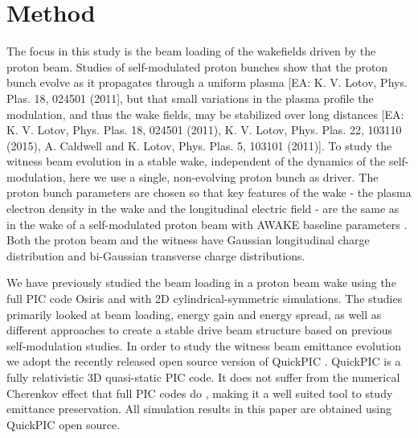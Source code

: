 \documentclass[aps,prstab,reprint,amsmath,amssymb,groupedaddress,onecolumn]{revtex4-1}
\begin{document}


\section[\label{S:M}]{Method}

The focus in this study is the beam loading of the wakefields driven by the proton beam.   Studies of self-modulated proton bunches show that the proton bunch evolve as it propagates through a uniform plasma [EA: K. V. Lotov, Phys. Plas. 18, 024501 (2011], but that small variations in the plasma profile the modulation, and thus the wake fields, may be stabilized over long distances [EA: K. V. Lotov, Phys. Plas. 18, 024501 (2011), K. V. Lotov, Phys. Plas. 22, 103110 (2015), A. Caldwell and K. Lotov, Phys. Plas. 5, 103101 (2011)].  To study the witness beam evolution in a stable wake, independent of the dynamics of the self-modulation, %
here we use a single, non-evolving proton bunch as driver.  The proton bunch parameters are chosen so that key features of the wake - the plasma electron density in the wake and the longitudinal electric field - are the same as %
in the wake of a self-modulated proton beam with AWAKE baseline parameters \cite{gschwendtner:2016}.  Both the proton beam and the witness have Gaussian %
longitudinal charge distribution and bi-Gaussian transverse charge distributions.

We have previously studied the beam loading in a proton beam wake using the full PIC code Osiris \cite{fonseca:2002}
and with 2D cylindrical-symmetric simulations.  The studies \cite{berglyd_olsen:2015, berglyd_olsen:2016} primarily looked at beam loading, energy gain and energy spread, as well as different approaches to create a stable drive beam structure based on previous self-modulation studies.  In order to study the witness beam emittance evolution we adopt the recently released open source version of QuickPIC \cite{huang:2006, an:2013}. QuickPIC is a fully relativistic 3D quasi-static PIC code. It does not suffer from
the numerical Cherenkov effect that full PIC codes do \cite{godfrey:1974,lehe:2013}, making it a well suited tool to
study emittance preservation.  All simulation results in this paper are %
obtained using QuickPIC open source.  
\end{document}

